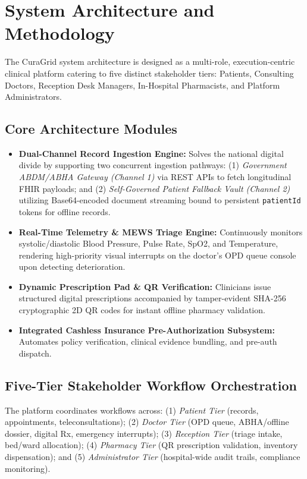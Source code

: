 \documentclass[conference]{IEEEtran}
\begin{document}
\section{System Architecture and Methodology}
The CuraGrid system architecture is designed as a multi-role, execution-centric clinical platform catering to five distinct stakeholder tiers: Patients, Consulting Doctors, Reception Desk Managers, In-Hospital Pharmacists, and Platform Administrators.

\subsection{Core Architecture Modules}
\begin{itemize}
    \item \textbf{Dual-Channel Record Ingestion Engine:} Solves the national digital divide by supporting two concurrent ingestion pathways: (1) \textit{Government ABDM/ABHA Gateway (Channel 1)} via REST APIs to fetch longitudinal FHIR payloads; and (2) \textit{Self-Governed Patient Fallback Vault (Channel 2)} utilizing Base64-encoded document streaming bound to persistent \texttt{patientId} tokens for offline records.
    \item \textbf{Real-Time Telemetry \& MEWS Triage Engine:} Continuously monitors systolic/diastolic Blood Pressure, Pulse Rate, SpO2, and Temperature, rendering high-priority visual interrupts on the doctor's OPD queue console upon detecting deterioration.
    \item \textbf{Dynamic Prescription Pad \& QR Verification:} Clinicians issue structured digital prescriptions accompanied by tamper-evident SHA-256 cryptographic 2D QR codes for instant offline pharmacy validation.
    \item \textbf{Integrated Cashless Insurance Pre-Authorization Subsystem:} Automates policy verification, clinical evidence bundling, and pre-auth dispatch.
\end{itemize}

\subsection{Five-Tier Stakeholder Workflow Orchestration}
The platform coordinates workflows across: (1) \textit{Patient Tier} (records, appointments, teleconsultations); (2) \textit{Doctor Tier} (OPD queue, ABHA/offline dossier, digital Rx, emergency interrupts); (3) \textit{Reception Tier} (triage intake, bed/ward allocation); (4) \textit{Pharmacy Tier} (QR prescription validation, inventory dispensation); and (5) \textit{Administrator Tier} (hospital-wide audit trails, compliance monitoring).
\end{document}
